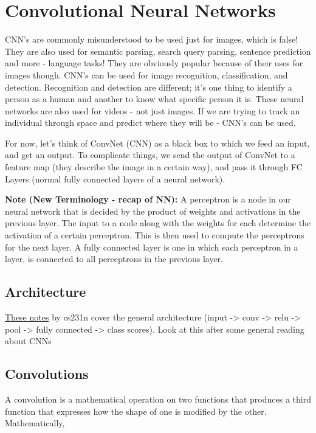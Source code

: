\chapter{Convolutional Neural Networks}

CNN's are commonly misunderstood to be used just for images, which is false! They are also used for semantic parsing, search query parsing, sentence prediction and more - language tasks! They are obviously popular because of their uses for images though. CNN's can be used for image recognition, classification, and detection. Recognition and detection are different; it's one thing to identify a person as a human and another to know what specific person it is. These neural networks are also used for videos - not just images. If we are trying to track an individual through space and predict where they will be - CNN's can be used.

For now, let's think of ConvNet (CNN) as a black box to which we feed an input, and get an output. To complicate things, we send the output of ConvNet to a feature map (they describe the image in a certain way), and pass it through FC Layers (normal fully connected layers of a neural network).

\textbf{Note (New Terminology - recap of NN):} A perceptron is a node in our neural network that is decided by the product of weights and activations in the previous layer. The input to a node along with the weights for each determine the activation of a certain perceptron. This is then used to compute the perceptrons for the next layer. A fully connected layer is one in which each perceptron in a layer, is connected to all perceptrons in the previous layer.

\section{Architecture}

\href{https://cs231n.github.io/convolutional-networks/#overview}{These notes} by cs231n cover the general architecture (input -> conv -> relu -> pool -> fully connected -> class scores). Look at this after some general reading about CNNs

\section{Convolutions}

A convolution is a mathematical operation on two functions that produces a third function that expresses how the shape of one is modified by the other. Mathematically,

